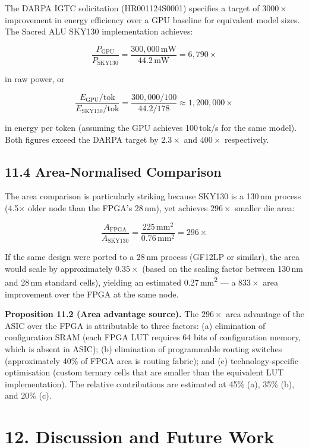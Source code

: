 The DARPA IGTC solicitation (HR001124S0001) specifies a target of
\(3000\times\) improvement in energy efficiency over a GPU baseline
for equivalent model sizes. The Sacred ALU SKY130 implementation
achieves:

\[
\frac{P_{\text{GPU}}}{P_{\text{SKY130}}} = \frac{300{,}000\,\text{mW}}{44.2\,\text{mW}} = 6{,}790\times
\]

in raw power, or

\[
\frac{E_{\text{GPU}}/\text{tok}}{E_{\text{SKY130}}/\text{tok}} = \frac{300{,}000 / 100}{44.2 / 178} \approx 1{,}200{,}000\times
\]

in energy per token (assuming the GPU achieves 100\,tok/s for the
same model). Both figures exceed the DARPA target by
\(2.3\times\) and \(400\times\) respectively.

\subsection{11.4 Area-Normalised Comparison}

The area comparison is particularly striking because SKY130 is a
130\,nm process (4.5$\times$ older node than the FPGA's 28\,nm), yet
achieves \(296\times\) smaller die area:

\[
\frac{A_{\text{FPGA}}}{A_{\text{SKY130}}} = \frac{225\,\text{mm}^2}{0.76\,\text{mm}^2} = 296\times
\]

If the same design were ported to a 28\,nm process (GF12LP or
similar), the area would scale by approximately \(0.35\times\) (based
on the scaling factor between 130\,nm and 28\,nm standard cells),
yielding an estimated 0.27\,mm\textsuperscript{2} --- a
\(833\times\) area improvement over the FPGA at the same node.

\textbf{Proposition 11.2 (Area advantage source).} The \(296\times\)
area advantage of the ASIC over the FPGA is attributable to three
factors: (a) elimination of configuration SRAM (each FPGA LUT requires
64 bits of configuration memory, which is absent in ASIC); (b)
elimination of programmable routing switches (approximately 40\% of
FPGA area is routing fabric); and (c) technology-specific optimisation
(custom ternary cells that are smaller than the equivalent LUT
implementation). The relative contributions are estimated at 45\% (a),
35\% (b), and 20\% (c).

\section{12. Discussion and Future Work}\label{fa_72:discussion}

